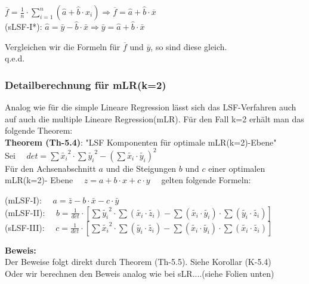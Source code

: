 \documentclass[12pt]{article}
\begin{document}
\begin{large}
\begin{center}
$ \overline{f} = \frac{1}{n} \cdot \sum_{i=1}^{n} (\hat{a}+ \hat{b} \cdot x_i) \Longrightarrow \overline{f} = \hat{a} + \hat{b} \cdot  \overline{x} $ \\[0.2cm]
(sLSF-I*): $ \hat{a}  = \bar{y} - \hat{b} \cdot \bar{x} \Longrightarrow \bar{y}  = \hat{a} + \hat{b} \cdot \bar{x} $
\end{center} 
\end{large}
Vergleichen wir die Formeln für  $\overline{f}$ und $\overline{y}$, so sind diese gleich. \\
q.e.d.

\subsubsection{Detailberechnung für mLR(k=2)}

Analog wie für die simple Lineare Regression lässt sich das LSF-Verfahren auch auf auch die multiple Lineare Regression(mLR). Für den Fall k=2 erhält man das folgende Theorem:\\
%
\textbf{Theorem (Th-5.4)}: "LSF Komponenten für optimale mLR(k=2)-Ebene" \\[0.2cm]
Sei $ \quad det = \sum{\widetilde{x_i}^2} \cdot \sum{\widetilde{y_i}^2}  -  (\sum{\widetilde{x_i} \cdot \widetilde{y_i}})^2 \quad $ \\
Für den Achsenabschnitt $a$ und die Steigungen $b$ und $c$ einer optimalen mLR(k=2)- Ebene $\quad  z = a +  b \cdot x + c \cdot y \quad $  
gelten folgende Formeln:\\[0.5cm]
\begin{large}
(mLSF-I): $ \quad a = \bar{z} - b \cdot \bar{x} - c \cdot \bar{y} \ \qquad \qquad \qquad\qquad $ \\[0.3cm]
(mLSF-II): $ \quad b = \frac{1}{det} \cdot \left[  \sum{\widetilde{y_i}^2} \cdot  \sum{(\widetilde{x_i} \cdot \widetilde{z_i})} - \sum{(\widetilde{x_i} \cdot \widetilde{y_i})} \cdot  \sum{(\widetilde{y_i} \cdot \widetilde{z_i})}          \right] $    \\[0.3cm]                                
(sLSF-III): $ \quad c = \frac{1}{det} \cdot \left[ \sum{\widetilde{x_i}^2} \cdot  \sum{(\widetilde{y_i} \cdot \widetilde{z_i})} - \sum{(\widetilde{x_i} \cdot \widetilde{y_i})} \cdot  \sum{( \widetilde{x_i} \cdot \widetilde{z_i})}          \right] $  \\[0.5cm]
\end{large}
\textbf{Beweis:}\\[0.2cm]
Der Beweise folgt direkt durch Theorem (Th-5.5). Siehe Korollar (K-5.4)\\[0.3cm]
Oder wir berechnen den Beweis analog wie bei sLR....(siehe Folien unten)\\[0.3cm] 
%
{\color{red}{***********************************************************************\\ 
****** Beweis/Detail-Berechnung für (k=2) mit folgenden Folien *********\\
************************************************************************}}\\[0.2cm]
\end{document}
